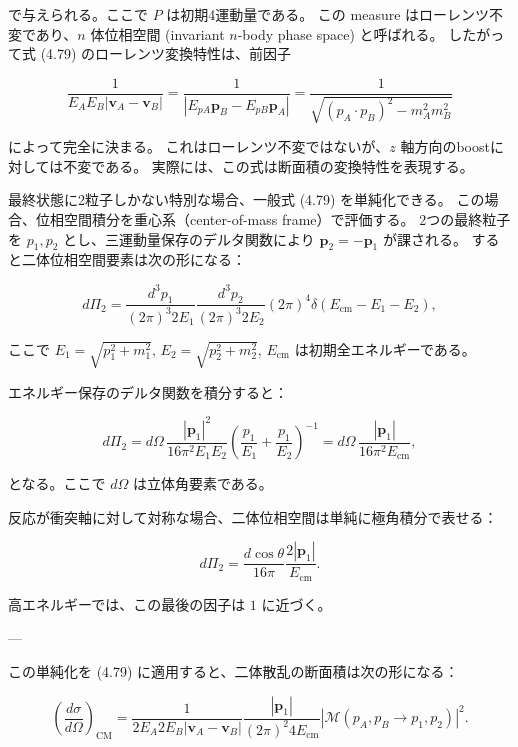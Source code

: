 \documentclass[a4paper,12pt]{article}
\begin{document}
で与えられる。ここで $P$ は初期4運動量である。  
この measure はローレンツ不変であり、$n$ 体位相空間 (invariant $n$-body phase space) と呼ばれる。  
したがって式 (4.79) のローレンツ変換特性は、前因子

\[
\frac{1}{E_A E_B |\mathbf{v}_A - \mathbf{v}_B|}
= \frac{1}{|E_{pA}\mathbf{p}_B - E_{pB}\mathbf{p}_A|}
= \frac{1}{\sqrt{(p_A\cdot p_B)^2 - m_A^2 m_B^2}}
\]

によって完全に決まる。  
これはローレンツ不変ではないが、$z$ 軸方向のboostに対しては不変である。  
実際には、この式は断面積の変換特性を表現する。

最終状態に2粒子しかない特別な場合、一般式 (4.79) を単純化できる。  
この場合、位相空間積分を重心系（center-of-mass frame）で評価する。  
2つの最終粒子を $p_1, p_2$ とし、三運動量保存のデルタ関数により $\mathbf{p}_2 = -\mathbf{p}_1$ が課される。  
すると二体位相空間要素は次の形になる：

\begin{equation}
d\Pi_2 = \frac{d^3p_1}{(2\pi)^3 2E_1} \frac{d^3p_2}{(2\pi)^3 2E_2}
(2\pi)^4 \delta(E_{\text{cm}} - E_1 - E_2),
\tag{4.81}
\end{equation}

ここで $E_1 = \sqrt{p_1^2 + m_1^2}, \, E_2 = \sqrt{p_2^2 + m_2^2}, \, E_{\text{cm}}$ は初期全エネルギーである。  

エネルギー保存のデルタ関数を積分すると：

\begin{equation}
d\Pi_2 = d\Omega \, \frac{|\mathbf{p}_1|^2}{16\pi^2 E_1 E_2} 
\left( \frac{p_1}{E_1} + \frac{p_1}{E_2} \right)^{-1}
= d\Omega \, \frac{|\mathbf{p}_1|}{16\pi^2 E_{\text{cm}}},
\tag{4.82}
\end{equation}

となる。ここで $d\Omega$ は立体角要素である。  

反応が衝突軸に対して対称な場合、二体位相空間は単純に極角積分で表せる：

\begin{equation}
d\Pi_2 = \frac{d\cos\theta}{16\pi} \frac{2|\mathbf{p}_1|}{E_{\text{cm}}}.
\tag{4.83}
\end{equation}

高エネルギーでは、この最後の因子は $1$ に近づく。  

---

この単純化を (4.79) に適用すると、二体散乱の断面積は次の形になる：

\begin{equation}
\left(\frac{d\sigma}{d\Omega}\right)_{\text{CM}}
= \frac{1}{2E_A 2E_B |\mathbf{v}_A - \mathbf{v}_B|}
\frac{|\mathbf{p}_1|}{(2\pi)^2 4E_{\text{cm}}}
|\mathcal{M}(p_A,p_B \to p_1,p_2)|^2.
\tag{4.84}
\end{equation}
\end{document}

